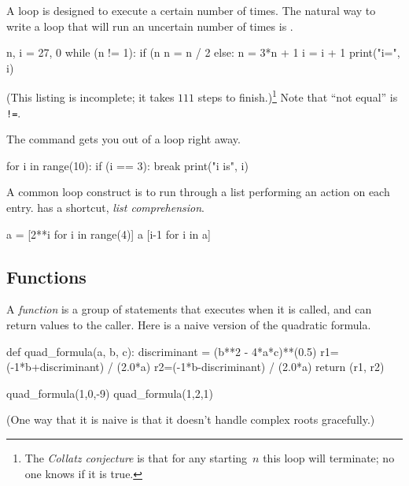 A  loop is designed to execute a certain
number of times.
The natural way to write a loop that will run an uncertain number of times
is .
\begin{pyconsole}
n, i = 27, 0
while (n != 1):
    if (n %
        n = n / 2
    else:
        n = 3*n + 1
    i = i + 1
    print("i=", i)

\end{pyconsole}
\noindent
(This listing is incomplete; it takes $111$ steps to finish.)\footnote{The 
\protect\textit{Collatz conjecture} is 
that for any starting~$n$ this loop will 
terminate; no one knows if it is true.}
Note that ``not equal'' is \lstinline[style=inline]@!=@. 

The  command gets you out of a loop right away.
\begin{pyconsole}
for i in range(10):
    if (i == 3):
        break
    print("i is", i)

\end{pyconsole}

A common loop construct is to run through a list
performing an action on each entry.
\python{} has a shortcut, \textit{list comprehension}.
\begin{pyconsole}
a = [2**i for i in range(4)]
a
[i-1 for i in a]
\end{pyconsole}



\subsection{Functions}
A \textit{function} is a group of statements that executes when it is called,
and can return values to the caller.
Here is a naive version of the quadratic formula.
\begin{pyconsole}
def quad_formula(a, b, c):
    discriminant = (b**2 - 4*a*c)**(0.5)
    r1=(-1*b+discriminant) / (2.0*a)
    r2=(-1*b-discriminant) / (2.0*a)
    return (r1, r2)

quad_formula(1,0,-9)
quad_formula(1,2,1)
\end{pyconsole}
\noindent
(One way that it is naive is that it doesn't handle complex roots gracefully.)
%


